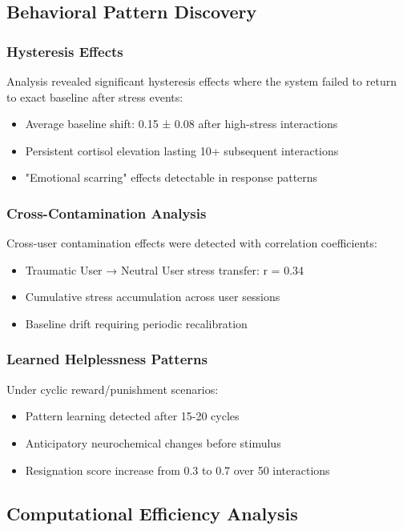 \documentclass[12pt]{article}
\begin{document}
\subsection{Behavioral Pattern Discovery}

\subsubsection{Hysteresis Effects}

Analysis revealed significant hysteresis effects where the system failed to return to exact baseline after stress events:
\begin{itemize}
\item Average baseline shift: 0.15 ± 0.08 after high-stress interactions
\item Persistent cortisol elevation lasting 10+ subsequent interactions
\item "Emotional scarring" effects detectable in response patterns
\end{itemize}

\subsubsection{Cross-Contamination Analysis}

Cross-user contamination effects were detected with correlation coefficients:
\begin{itemize}
\item Traumatic User → Neutral User stress transfer: r = 0.34
\item Cumulative stress accumulation across user sessions
\item Baseline drift requiring periodic recalibration
\end{itemize}

\subsubsection{Learned Helplessness Patterns}

Under cyclic reward/punishment scenarios:
\begin{itemize}
\item Pattern learning detected after 15-20 cycles
\item Anticipatory neurochemical changes before stimulus
\item Resignation score increase from 0.3 to 0.7 over 50 interactions
\end{itemize}

\subsection{Computational Efficiency Analysis}
\end{document}
